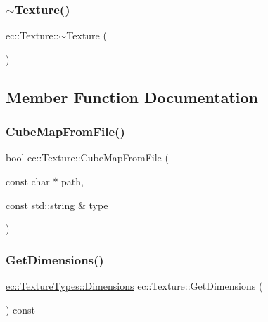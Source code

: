 \mbox{\label{classec_1_1_texture_ae567d80654dd09c6b02a38ca8de29ead}} 
\subsubsection{\texorpdfstring{$\sim$\+Texture()}{~Texture()}}
{\footnotesize\ttfamily ec\+::\+Texture\+::$\sim$\+Texture (\begin{DoxyParamCaption}{ }\end{DoxyParamCaption})}



\subsection{Member Function Documentation}
\mbox{\label{classec_1_1_texture_a4ddfae4d7a899f946f3453ecf3652d51}} 
\subsubsection{\texorpdfstring{Cube\+Map\+From\+File()}{CubeMapFromFile()}}
{\footnotesize\ttfamily bool ec\+::\+Texture\+::\+Cube\+Map\+From\+File (\begin{DoxyParamCaption}\item[{const char $\ast$}]{path,  }\item[{const std\+::string \&}]{type }\end{DoxyParamCaption})}

\mbox{\label{classec_1_1_texture_a774a1f7dfefd55b01e7f645ba3b23660}} 
\subsubsection{\texorpdfstring{Get\+Dimensions()}{GetDimensions()}}
{\footnotesize\ttfamily \mbox{\hyperlink{structec_1_1_texture_types_aa9ef510185cfe61d20918eb0b2c13501}{ec\+::\+Texture\+Types\+::\+Dimensions}} ec\+::\+Texture\+::\+Get\+Dimensions (\begin{DoxyParamCaption}{ }\end{DoxyParamCaption}) const}

